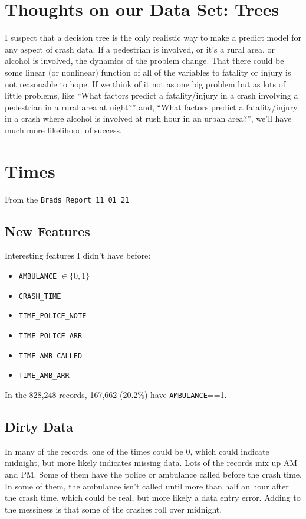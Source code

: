 \section{Thoughts on our Data Set:  Trees}

I suspect that a decision tree is the only realistic way to make a predict model for any aspect of crash data.  If a pedestrian is involved, or it's a rural area, or alcohol is involved, the dynamics of the problem change.  That there could be some linear (or nonlinear) function of all of the variables to fatality or injury is not reasonable to hope.  If we think of it not as one big problem but as lots of little problems, like ``What factors predict a fatality/injury in a crash involving a pedestrian in a rural area at night?'' and, ``What factors predict a fatality/injury in a crash where alcohol is involved at rush hour in an urban area?'',  we'll have much more likelihood of success.  


\section{Times}

From the \verb|Brads_Report_11_01_21|

\subsection{New Features}
Interesting features I didn't have before:

\begin{itemize}
	\item \verb|AMBULANCE| $\in \{0,1\}$
	\item \verb|CRASH_TIME|
	\item \verb|TIME_POLICE_NOTE|
	\item \verb|TIME_POLICE_ARR|
	\item \verb|TIME_AMB_CALLED|
	\item \verb|TIME_AMB_ARR|
\end{itemize}

In the 828,248 records, 167,662 (20.2\%) have \verb|AMBULANCE|==1.

\subsection{Dirty Data}

In many of the records, one of the times could be 0, which could indicate midnight, but more likely indicates missing data.  Lots of the records mix up AM and PM.  Some of them have the police or ambulance called before the crash time.  In some of them, the ambulance isn't called until more than half an hour after the crash time, which could be real, but more likely a data entry error.  Adding to the messiness is that some of the crashes roll over midnight.  

